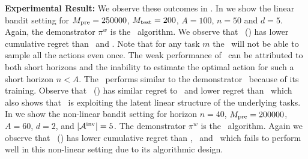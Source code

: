 \textbf{Experimental Result:} We observe these outcomes in . In  we show the linear bandit setting for $M_{\text{pre}} = 250000$, $M_{\text{test}} = 200$, $A=100$, $n=50$ and $d=5$. 
%
%
Again, the demonstrator $\pi^w$ is the \ts\ algorithm. We observe that \pred\ (\gt) has lower cumulative regret than \dptg\ and \ad. Note that for any task $m$ the \ts\ will not be able to sample all the actions even once.
%
The weak performance of \dptg\ can be attributed to both short horizons and the inability to estimate the optimal action for such a short horizon $n < A$. The \ad\ performs similar to the demonstrator \ts\ because of its training.
%
Observe that \pred\ (\gt) has similar regret to \linucb\ and lower regret than \ts\ which also shows that \pred\ is exploiting the latent linear structure of the underlying tasks.
%
In  we show the non-linear bandit setting for horizon $n=40$, $M_{\text{pre}} = 200000$, $A=60$, $d=2$, and $|\mathcal{A}^{\text{inv}}|=5$. The demonstrator $\pi^w$ is the \ts\ algorithm.
%
%
Again we observe that \pred\ (\gt) has lower cumulative regret than \dptg, \ad\ and \linucb\ which fails to perform well in this non-linear setting due to its algorithmic design. 


